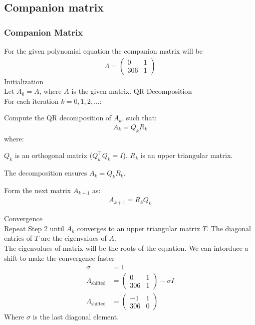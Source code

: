\documentclass{beamer}
\theoremstyle{remark}
\newcommand{\myvec}[1]{\ensuremath{\begin{pmatrix}#1\end{pmatrix}}}
\numberwithin{equation}{section}
\begin{document}
\subsection{Companion matrix}
\begin{frame}[fragile]
\frametitle{Companion Matrix}
For the given polynomial equation the companion matrix will be
\begin{align}
	\Lambda = \myvec{0 & 1\\306 & 1}
\end{align}
 Initialization \\
Let $A_0 = A $, where $A$ is the given matrix.
QR Decomposition \\
For each iteration $ k = 0, 1, 2, \dots $:

     Compute the QR decomposition of \( A_k \), such that:
    \begin{align}
    A_k = Q_k R_k
    \end{align}
    where:
    
         $Q_k $ is an orthogonal matrix ($ Q_k^\top Q_k = I $).
         $ R_k $ is an upper triangular matrix.
    
    The decomposition ensures $ A_k = Q_k R_k $.

     Form the next matrix \( A_{k+1} \) as:
    \begin{align}
    A_{k+1} = R_k Q_k
    \end{align}
\end{frame}
\begin{frame}
 Convergence\\
Repeat Step 2 until $ A_k $ converges to an upper triangular matrix $ T $. The diagonal entries of $T$ are the eigenvalues of $A$.\\
 The eigenvalues of matrix will be the roots of the equation. We can intorduce a shift to make the convergence faster
\begin{align}
\sigma &= 1\\
\Lambda_{\text{shifted}} &= \myvec{0 & 1\\306& 1} - \sigma I\\
\Lambda_{\text{shifted}} &= \myvec{-1 & 1\\ 306 & 0}
\end{align}
Where $\sigma$ is the last diagonal element.
\end{frame}
\end{document}
